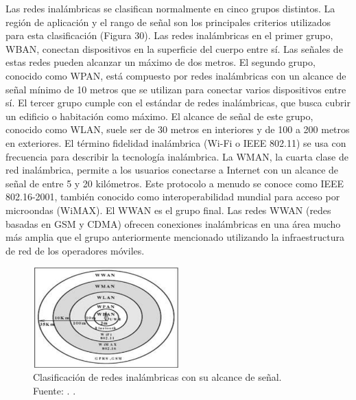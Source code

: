 Las redes inalámbricas se clasifican normalmente en cinco grupos distintos. La región de aplicación y el rango de señal son los principales criterios utilizados para esta clasificación (Figura 30). Las redes inalámbricas en el primer grupo, WBAN, conectan dispositivos en la superficie del cuerpo entre sí. Las señales de estas redes pueden alcanzar un máximo de dos metros. El segundo grupo, conocido como WPAN, está compuesto por redes inalámbricas con un alcance de señal mínimo de 10 metros que se utilizan para conectar varios dispositivos entre sí. El tercer grupo cumple con el estándar de redes inalámbricas, que busca cubrir un edificio o habitación como máximo. El alcance de señal de este grupo, conocido como WLAN, suele ser de 30 metros en interiores y de 100 a 200 metros en exteriores. El término fidelidad inalámbrica (Wi-Fi o IEEE 802.11) se usa con frecuencia para describir la tecnología inalámbrica. La WMAN, la cuarta clase de red inalámbrica, permite a los usuarios conectarse a Internet con un alcance de señal de entre 5 y 20 kilómetros. Este protocolo a menudo se conoce como IEEE 802.16-2001, también conocido como interoperabilidad mundial para acceso por microondas (WiMAX). El WWAN es el grupo final. Las redes WWAN (redes basadas en GSM y CDMA) ofrecen conexiones inalámbricas en una área mucho más amplia que el grupo anteriormente mencionado utilizando la infraestructura de red de los operadores móviles. \parencite{tec_ieee2010draft}
\begin{figure}[!ht]
	\begin{center}
		\includegraphics[width=0.5\textwidth]{2/figures/clasificacionredes.jpg}
		\caption[Clasificación de redes inalámbricas con su alcance de señal]{Clasificación de redes inalámbricas con su alcance de señal.\\
			Fuente: \cite{tec_ieee2010draft}. .}
		\label{2:fig52}
	\end{center}
\end{figure}


